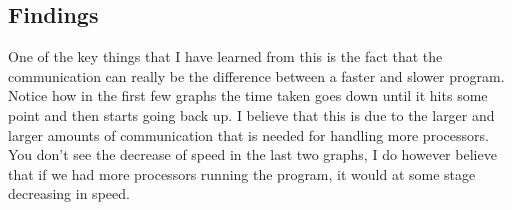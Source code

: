 \documentclass{article}
\begin{document}
        \subsection{Findings}
            One of the key things that I have learned from this is the fact that the communication can really be the difference between a faster
            and slower program. Notice how in the first few graphs the time taken goes down until it hits some point and then starts going back up.
            I believe that this is due to the larger and larger amounts of communication that is needed for handling more processors. You
            don't see the decrease of speed in the last two graphs, I do however believe that if we had more processors running the program, it would
            at some stage decreasing in speed.

        
\end{document}
